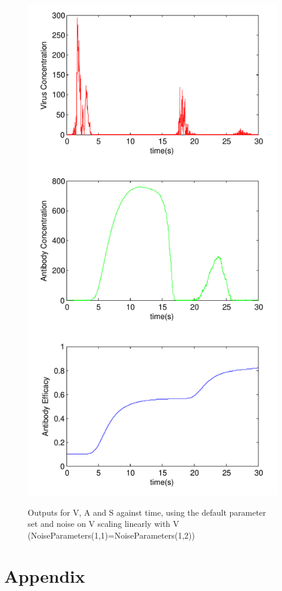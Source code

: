 \documentclass[a4paper, 12pt]{report}
\begin{document}
\begin{figure}
\begin{center}
\includegraphics[width=120mm]{Resurgance_scissored.pdf}
\label{resurgance}
\caption{Outputs for V, A and S against time, using the default parameter set and noise on V scaling linearly with V (NoiseParameters(1,1)=NoiseParameters(1,2))}
\end{center}
\end{figure}

\chapter{Appendix}



\end{document}

